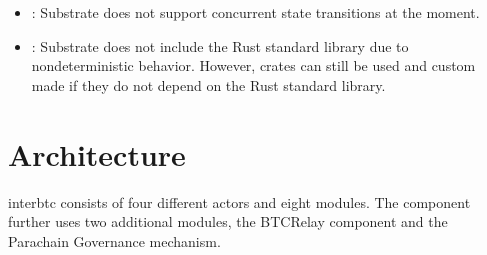 \documentclass[a4paper,10pt,english]{sphinxmanual}
\begin{document}
\begin{itemize}
\item {} 
: Substrate does not support concurrent state transitions at the moment.

\item {} 
: Substrate does not include the Rust standard library due to non\sphinxhyphen{}deterministic behavior. However, crates can still be used and custom made if they do not depend on the Rust standard library.

\end{itemize}


\chapter{Architecture}
\label{\detokenize{intro/architecture:architecture}}\label{\detokenize{intro/architecture::doc}}
interbtc consists of four different actors and eight modules. The component further uses two additional modules, the BTC\sphinxhyphen{}Relay component and the Parachain Governance mechanism.
\end{document}
